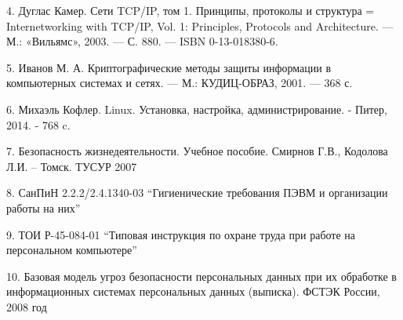  4. Дуглас Камер. Сети TCP/IP, том 1. Принципы, протоколы и структура = Internetworking with TCP/IP, Vol. 1: Principles, Protocols and Architecture. — М.: «Вильямс», 2003. — С. 880. — ISBN 0-13-018380-6.
 
 5. Иванов М. А. Криптографические методы защиты информации в компьютерных системах и сетях. — М.: КУДИЦ-ОБРАЗ, 2001. — 368 с.
 
 6. Михаэль Кофлер. Linux. Установка, настройка, администрирование. - Питер, 2014. - 768 c.
 
 7. Безопасность жизнедеятельности. Учебное пособие. Смирнов Г.В., Кодолова Л.И. – Томск. ТУСУР 2007
 
 8. СанПиН 2.2.2/2.4.1340-03 ``Гигиенические требования ПЭВМ и организации работы на них''
 
 9. ТОИ Р-45-084-01 ``Типовая инструкция по охране труда при работе на персональном компьютере''
 
 10. Базовая модель угроз безопасности персональных данных при их обработке в информационных системах персональных данных (выписка). ФСТЭК России, 2008 год

